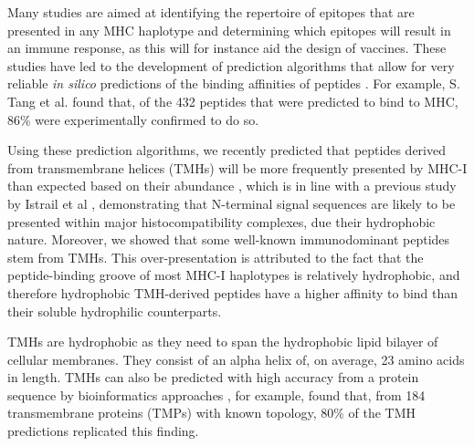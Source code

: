 
Many studies are aimed at identifying the repertoire of epitopes that are presented 
in any MHC haplotype and determining which epitopes will result in an immune response, 
as this will for instance aid the design of vaccines. 
These studies have led to the development of prediction algorithms 
that allow for very reliable \emph{in silico} predictions 
of the binding affinities of peptides
\cite{larsen2010identification,schellens2008unanticipated,tang2011genome}.
For example, S. Tang et al. \cite{tang2011genome} found that, 
of the 432 peptides that were predicted to bind to MHC,
86\% were experimentally confirmed to do so. 


Using these prediction algorithms, 
we recently predicted that peptides derived 
from transmembrane helices (TMHs) 
will be more frequently presented by MHC-I 
than expected based on their abundance \cite{bianchi2017},
which is in line with a previous study 
by Istrail et al \cite{istrail2004comparative},
demonstrating that N-terminal signal sequences 
are likely to be presented within major histocompatibility complexes, 
due their hydrophobic nature. 
Moreover, we showed that some well-known immunodominant peptides stem from TMHs. 
This over-presentation is attributed to the fact 
that the peptide-binding groove of most MHC-I haplotypes 
is relatively hydrophobic, 
and therefore hydrophobic TMH-derived peptides have a higher affinity 
to bind than their soluble hydrophilic counterparts. 

TMHs are hydrophobic 
as they need to span the hydrophobic lipid bilayer of cellular membranes.
They consist of an alpha helix of, on average, 23 amino acids in length. 
TMHs can also be predicted with high accuracy from a protein sequence 
by bioinformatics approaches \cite{krogh2001predicting,kall2004combined,arai2004conpred,jones2007improving,klammer2009metatm,wang2019efficient},
for example, \cite{jones2007improving} found that,
from 184 transmembrane proteins (TMPs) with known topology, 
80\% of the TMH predictions replicated this finding.
 
